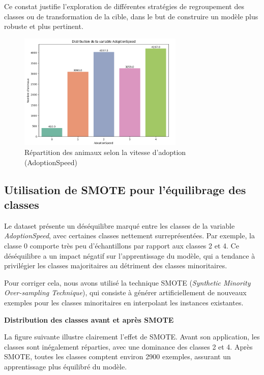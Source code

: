 \documentclass[a4paper,12pt]{article}
\begin{document}
Ce constat justifie l’exploration de différentes stratégies de regroupement des classes ou de transformation de la cible, dans le but de construire un modèle plus robuste et plus pertinent.

\begin{figure}[H]
    \centering
    \includegraphics[width=0.7\textwidth]{adoption_speed_distribution.png}
    \caption{Répartition des animaux selon la vitesse d’adoption (AdoptionSpeed)}
    \label{fig:adoption_speed}
\end{figure}

\subsection{Utilisation de SMOTE pour l'équilibrage des classes}

Le dataset présente un déséquilibre marqué entre les classes de la variable \textit{AdoptionSpeed}, avec certaines classes nettement surreprésentées. Par exemple, la classe 0 comporte très peu d'échantillons par rapport aux classes 2 et 4. Ce déséquilibre a un impact négatif sur l’apprentissage du modèle, qui a tendance à privilégier les classes majoritaires au détriment des classes minoritaires.

Pour corriger cela, nous avons utilisé la technique SMOTE (\textit{Synthetic Minority Over-sampling Technique}), qui consiste à générer artificiellement de nouveaux exemples pour les classes minoritaires en interpolant les instances existantes.

\vspace{0.5em}
\noindent\textbf{Distribution des classes avant et après SMOTE}

La figure suivante illustre clairement l'effet de SMOTE. Avant son application, les classes sont inégalement réparties, avec une dominance des classes 2 et 4. Après SMOTE, toutes les classes comptent environ 2900 exemples, assurant un apprentissage plus équilibré du modèle.
\end{document}
